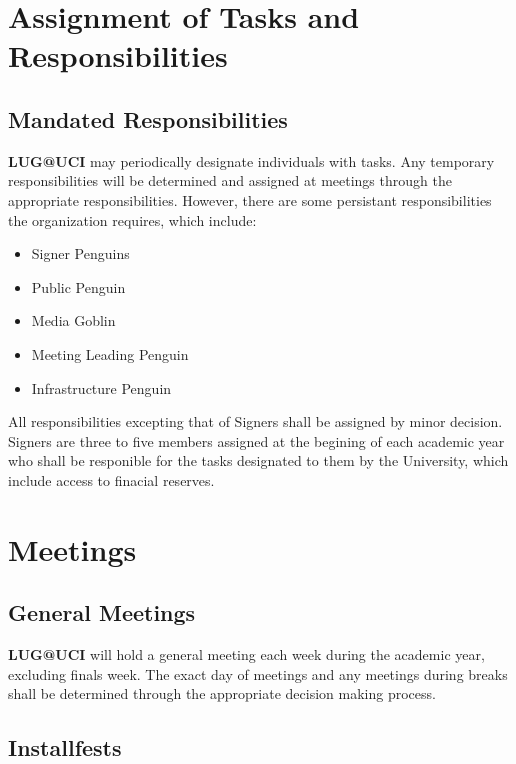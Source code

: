 \documentclass{article}
\begin{document}
\section{Assignment of Tasks and Responsibilities}



\subsection{Mandated Responsibilities}


\textbf{LUG@UCI} may periodically designate individuals with tasks.
Any temporary responsibilities will be determined and assigned at meetings
through the appropriate responsibilities. However, there are some persistant
responsibilities the organization requires, which include:

\begin{itemize}
\item Signer Penguins
\item Public Penguin
\item Media Goblin
\item Meeting Leading Penguin
\item Infrastructure Penguin
\end{itemize}

All responsibilities excepting that of Signers shall be assigned by minor
decision. Signers are three to five members assigned at the begining of each
academic year who shall be responible for the tasks designated to them by
the University, which include access to finacial reserves.

\section{Meetings}

\subsection{General Meetings}

\textbf{LUG@UCI} will hold a general meeting each week during the academic year,
excluding finals week. The exact day of meetings and any meetings during breaks
shall be determined through the appropriate decision making process.

\subsection{Installfests}
\end{document}
